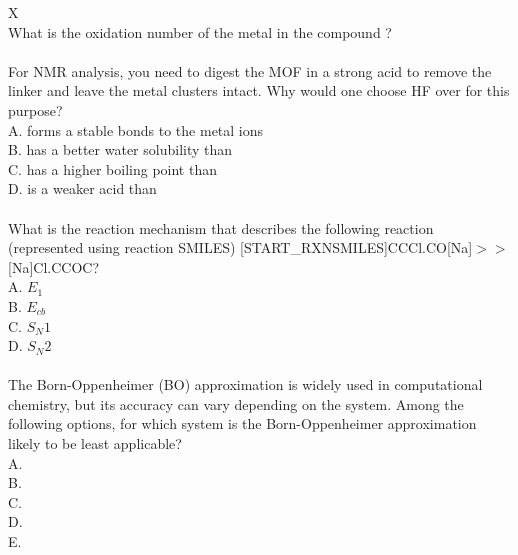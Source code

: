 \begin{xltabular}{\textwidth}{X}
            \midrule
             \\
            \midrule
            What is the oxidation number of the metal in the compound ? \\
            \midrule
             \\
            \midrule
            For NMR analysis, you need to digest the MOF in a strong acid to remove the linker and leave the metal clusters intact. Why would one choose HF over  for this purpose? \\
            A.  forms a stable bonds to the metal ions \\
            B.  has a better water solubility than  \\
            C.  has a higher boiling point than  \\
            D.  is a weaker acid than  \\
            \midrule
             \\
            \midrule
            What is the reaction mechanism that describes the following reaction (represented using reaction SMILES) [START\_RXNSMILES]CCCl.CO[Na]$>$$>$[Na]Cl.CCOC? \\
            A. $E_1$ \\
            B. $E_{cb}$ \\
            C. $S_N1$ \\
            D. $S_N2$ \\
            \midrule
             \\
            \midrule
            The Born-Oppenheimer (BO) approximation is widely used in computational chemistry, but its accuracy can vary depending on the system. Among the following options, for which system is the Born-Oppenheimer approximation likely to be least applicable? \\
            A.  \\
            B.  \\
            C.  \\
            D.  \\
            E.  \\
$$
\end{xltabular}
